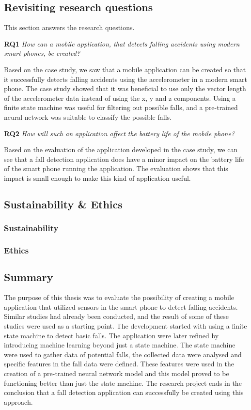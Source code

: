 \documentclass[12pt, a4paper, onecolumn]{article}
\begin{document}
	\subsection{Revisiting research questions}
	
	This section answers the research questions.
	
	\textbf{RQ1} \textit{How can a mobile application, that detects falling accidents using modern smart phones, be created?}
	
	Based on the case study, we saw that a mobile application can be created so that it successfully detects falling accidents using the accelerometer in a modern smart phone. The case study showed that it was beneficial to use only the vector length of the accelerometer data instead of using the x, y and z components. Using a finite state machine was useful for filtering out possible falls, and a pre-trained neural network was suitable to classify the possible falls.
	
	\textbf{RQ2} \textit{How will such an application affect the battery life of the mobile phone?}
	
	Based on the evaluation of the application developed in the case study, we can see that a fall detection application does have a minor impact on the battery life of the smart phone running the application. The evaluation shows that this impact is small enough to make this kind of application useful.
	
	\subsection{Sustainability \& Ethics}
	
	\subsubsection{Sustainability}
	
	\subsubsection{Ethics}
	
	\subsection{Summary}
	
	The purpose of this thesis was to evaluate the possibility of creating a mobile application that utilized sensors in the smart phone to detect falling accidents. Similar studies had already been conducted, and the result of some of these studies were used as a starting point. The development started with using a finite state machine to detect basic falls. The application were later refined by introducing machine learning beyond just a state machine. The state machine were used to gather data of potential falls, the collected data were analysed and specific features in the fall data were defined. These features were used in the creation of a pre-trained neural network model and this model proved to be functioning better than just the state machine. The research project ends in the conclusion that a fall detection application can successfully be created using this approach.
	
\end{document}
